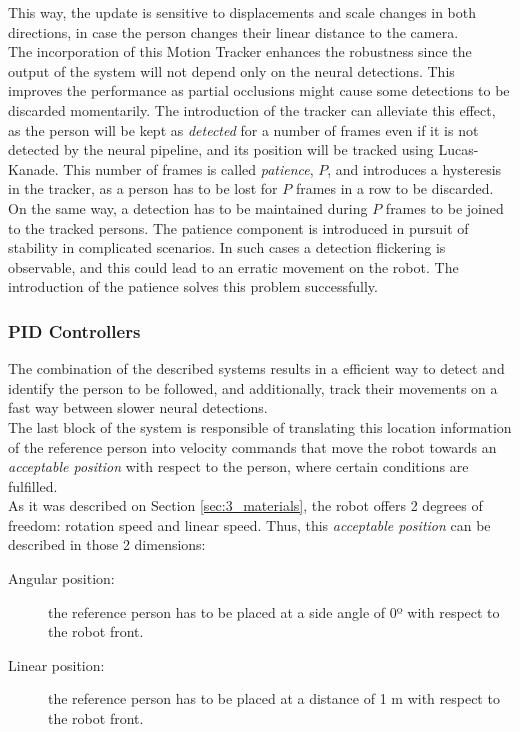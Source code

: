 This way, the update is sensitive to displacements and scale changes in both directions, in case the person changes their linear distance to the camera.\\



The incorporation of this Motion Tracker enhances the robustness since the output of the system will not depend only on the neural detections. This improves the performance as partial occlusions might cause some detections to be discarded momentarily. The introduction of the tracker can alleviate this effect, as the person will be kept as \textit{detected} for a number of frames even if it is not detected by the neural pipeline, and its position will be tracked using Lucas-Kanade. This number of frames is called \textit{patience}, $P$, and introduces a hysteresis in the tracker, as a person has to be lost for $P$ frames in a row to be discarded.\\



On the same way, a detection has to be maintained during $P$ frames to be joined to the tracked persons. The patience component is introduced in pursuit of stability in complicated scenarios. In such cases a detection flickering is observable, and this could lead to an erratic movement on the robot. The introduction of the patience solves this problem successfully.


\subsubsection{PID Controllers}
The combination of the described systems results in a efficient way to detect and identify the person to be followed, and additionally, track their movements on a fast way between slower neural detections.\\

The last block of the system is responsible of  translating this location information of the reference person into velocity commands that move the robot towards an \textit{acceptable position} with respect to the person, where certain conditions are fulfilled.\\

As it was described on Section \ref{sec:3_materials}, the robot offers 2 degrees of freedom: rotation speed and linear speed. Thus, this \textit{acceptable position} can be described in those 2 dimensions:
\begin{description}
	\item[Angular position:] the reference person has to be placed at a side angle of 0º with respect to the robot front.
	\item[Linear position:] the reference person has to be placed at a distance of 1 m with respect to the robot front.
\end{description}

